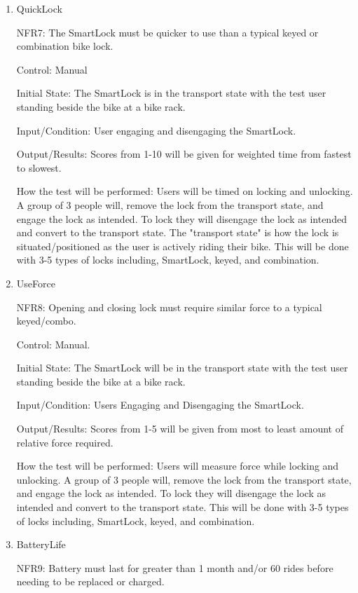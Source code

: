 \documentclass[12pt, titlepage]{article}
\begin{document}
\begin{enumerate}

\item{QuickLock

NFR7: The SmartLock must be quicker to use than a typical keyed or combination bike lock.  }

Control: Manual 

Initial State: The SmartLock is in the transport state with the test user standing beside the bike at a bike rack.

Input/Condition: User engaging and disengaging the SmartLock.

Output/Results: Scores from 1-10 will be given for weighted time from fastest to slowest.

How the test will be performed: Users will be timed on locking and unlocking. A group of 3 people will, remove the lock from the transport state, and engage the lock as intended. To lock they will disengage the lock as intended and convert to the transport state. The "transport state" is how the lock is situated/positioned as the user is actively riding their bike. This will be done with 3-5 types of locks including, SmartLock, keyed, and combination. 

\item{UseForce

NFR8: Opening and closing lock must require similar force to a typical keyed/combo.  }

Control: Manual.

Initial State: The SmartLock will be in the transport state with the test user standing beside the bike at a bike rack.

Input/Condition: Users Engaging and Disengaging the SmartLock.

Output/Results: Scores from 1-5 will be given from most to least amount of relative force required.

How the test will be performed: Users will measure force while locking and unlocking. A group of 3 people will, remove the lock from the transport state, and engage the lock as intended. To lock they will disengage the lock as intended and convert to the transport state. This will be done with 3-5 types of locks including, SmartLock, keyed, and combination.

\item{BatteryLife

NFR9: Battery must last for greater than 1 month and/or 60 rides before needing to be replaced or charged.  }


\end{enumerate}
\end{document}
